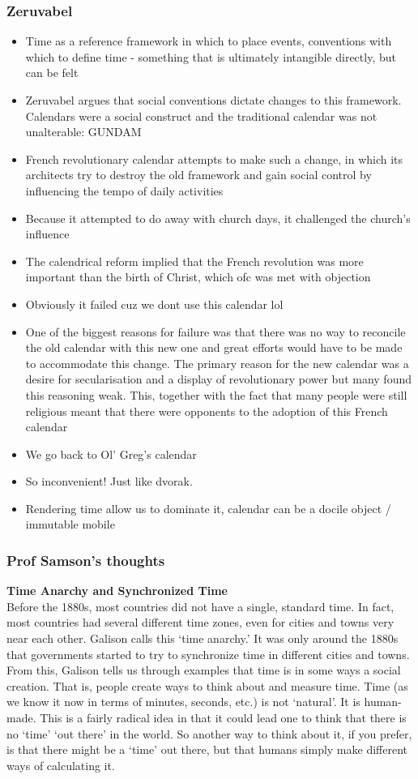 \documentclass[a4paper]{article}
\begin{document}
\subsubsection{Zeruvabel}
\begin{itemize}
	\item Time as a reference framework in which to place events, conventions with which to define time - something that is ultimately intangible directly, but can be felt
	\item Zeruvabel argues that social conventions dictate changes to this framework. Calendars were a social construct and the traditional calendar was not unalterable: GUNDAM 
	\item French revolutionary calendar attempts to make such a change, in which its architects try to destroy the old framework and gain social control by influencing the tempo of daily activities
	\item Because it attempted to do away with church days, it challenged the church's influence
	\item The calendrical reform implied that the French revolution was more important than the birth of Christ, which ofc was met with objection
	\item Obviously it failed cuz we dont use this calendar lol
	\item One of the biggest reasons for failure was that there was no way to reconcile the old calendar with this new one and great efforts would have to be made to accommodate this change. The primary reason for the new calendar was a desire for secularisation and a display of revolutionary power but many found this reasoning weak. This, together with the fact that many people were still religious meant that there were opponents to the adoption of this French calendar
	\item We go back to Ol' Greg's calendar
	\item So inconvenient! Just like dvorak. 
	\item Rendering time allow us to dominate it, calendar can be a docile object / immutable mobile
\end{itemize}

\subsubsection{Prof Samson's thoughts}
\textbf{Time Anarchy and Synchronized Time}\\
Before the 1880s, most countries did not have a single, standard time. In fact, most countries had several different time zones, even for cities and towns very near each other. Galison calls this `time anarchy.' It was only around the 1880s that governments started to try to synchronize time in different cities and towns. From this, Galison tells us through examples that time is in some ways a social creation. That is, people create ways to think about and measure time. Time (as we know it now in terms of minutes, seconds, etc.) is not `natural'. It is human-made. This is a fairly radical idea in that it could lead one to think that there is no `time' `out there' in the world. So another way to think about it, if you prefer, is that there might be a `time' out there, but that humans simply make different ways of calculating it.
\end{document}
